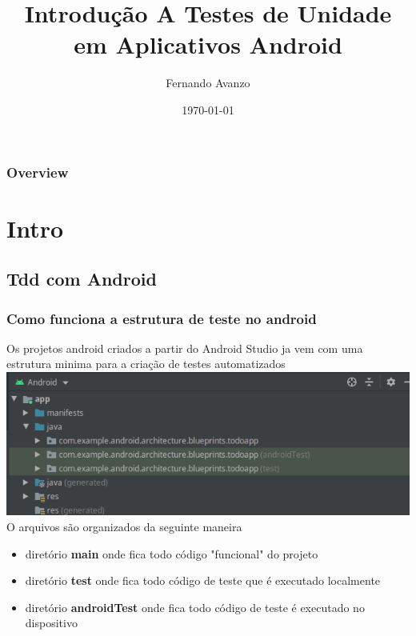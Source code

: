 \documentclass{beamer}
\title[TDD com Android]{Introdução A Testes de Unidade em Aplicativos Android}
\author{Fernando Avanzo} %
\institute[] 
{ %
\medskip
\textit{fernando.avanzo@gmail.com} %
}
\date{\today} %
\begin{document}
\begin{frame}
\titlepage %
\end{frame}

\begin{frame}
\frametitle{Overview} 
\tableofcontents %
\end{frame}

\section{Intro} %

\subsection{Tdd com Android} %

\begin{frame}
	\frametitle{Como funciona a estrutura de teste no android}
	Os projetos android criados a partir do Android Studio ja vem com uma estrutura minima para a criação de testes automatizados
	\includegraphics[scale=0.5]{test_structure_android}
	\newline O arquivos são organizados da seguinte maneira
	\begin{itemize}
		\item diretório \textbf{main} onde fica todo código "funcional" do projeto
		\item diretório \textbf{test} onde fica todo código de teste que é executado localmente 
		\item diretório \textbf{androidTest} onde fica todo código de teste é executado no dispositivo
	\end{itemize}
	
\end{frame}
\end{document}
